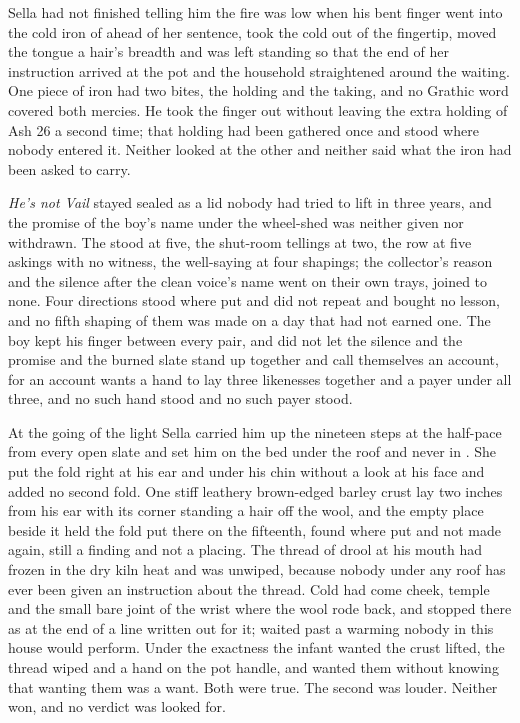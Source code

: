 Sella had not finished telling him the fire was low when his bent finger went into the cold iron of  ahead of her sentence, took the cold out of the fingertip, moved the tongue a hair's breadth and was left standing so that the end of her instruction arrived at the pot and the household straightened around the waiting. One piece of iron had two bites, the holding and the taking, and no Grathic word covered both mercies. He took the finger out without leaving the extra holding of Ash 26 a second time; that holding had been gathered once and stood where nobody entered it. Neither looked at the other and neither said what the iron had been asked to carry.

\emph{He's not Vail} stayed sealed as a lid nobody had tried to lift in three years, and the promise of the boy's name under the wheel-shed was neither given nor withdrawn. The  stood at five, the shut-room tellings at two, the row at five askings with no witness, the well-saying at four shapings; the collector's reason and the silence after the clean voice's name went on their own trays, joined to none. Four directions stood where put and did not repeat and bought no lesson, and no fifth shaping of them was made on a day that had not earned one. The boy kept his finger between every pair, and did not let the silence and the promise and the burned slate stand up together and call themselves an account, for an account wants a hand to lay three likenesses together and a payer under all three, and no such hand stood and no such payer stood.

At the going of the light Sella carried him up the nineteen steps at the half-pace from every open slate and set him on the bed under the roof and never in . She put the fold right at his ear and under his chin without a look at his face and added no second fold. One stiff leathery brown-edged barley crust lay two inches from his ear with its corner standing a hair off the wool, and the empty place beside it held the fold put there on the fifteenth, found where put and not made again, still a finding and not a placing. The thread of drool at his mouth had frozen in the dry kiln heat and was unwiped, because nobody under any roof has ever been given an instruction about the thread. Cold had come cheek, temple and the small bare joint of the wrist where the wool rode back, and stopped there as at the end of a line written out for it;  waited past a warming nobody in this house would perform. Under the exactness the infant wanted the crust lifted, the thread wiped and a hand on the pot handle, and wanted them without knowing that wanting them was a want. Both were true. The second was louder. Neither won, and no verdict was looked for.


